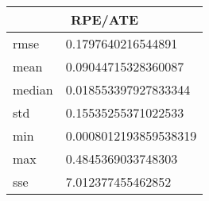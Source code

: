 \begin{table}[!ht] 
 \centering 
 \begin{tabular}{|l|l|} \hline 
 \multicolumn{2}{|c|}{RPE/ATE} \\ \hline 
 rmse & 0.1797640216544891 \\ \hline 
mean & 0.09044715328360087 \\ \hline 
median & 0.018553397927833344 \\ \hline 
std & 0.15535255371022533 \\ \hline 
min & 0.0008012193859538319 \\ \hline 
max & 0.4845369033748303 \\ \hline 
sse & 7.012377455462852 \\ \hline 
\end{tabular} 
 \end{table}